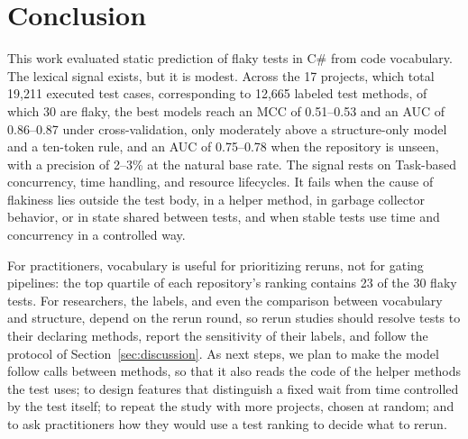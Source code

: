 \section{Conclusion}
\label{sec:conclusion}
This work evaluated static prediction of flaky tests in C\# from code vocabulary. The lexical signal exists, but it is modest. Across the 17 projects, which total 19,211 executed test cases, corresponding to 12,665 labeled test methods, of which 30 are flaky, the best models reach an MCC of 0.51--0.53 and an AUC of 0.86--0.87 under cross-validation, only moderately above a structure-only model and a ten-token rule, and an AUC of 0.75--0.78 when the repository is unseen, with a precision of 2--3\% at the natural base rate. The signal rests on Task-based concurrency, time handling, and resource lifecycles. It fails when the cause of flakiness lies outside the test body, in a helper method, in garbage collector behavior, or in state shared between tests, and when stable tests use time and concurrency in a controlled way.

For practitioners, vocabulary is useful for prioritizing reruns, not for gating pipelines: the top quartile of each repository's ranking contains 23 of the 30 flaky tests. For researchers, the labels, and even the comparison between vocabulary and structure, depend on the rerun round, so rerun studies should resolve tests to their declaring methods, report the sensitivity of their labels, and follow the protocol of Section~\ref{sec:discussion}. As next steps, we plan to make the model follow calls between methods, so that it also reads the code of the helper methods the test uses; to design features that distinguish a fixed wait from time controlled by the test itself; to repeat the study with more projects, chosen at random;  and to ask practitioners how they would use a test ranking to decide what to rerun.
